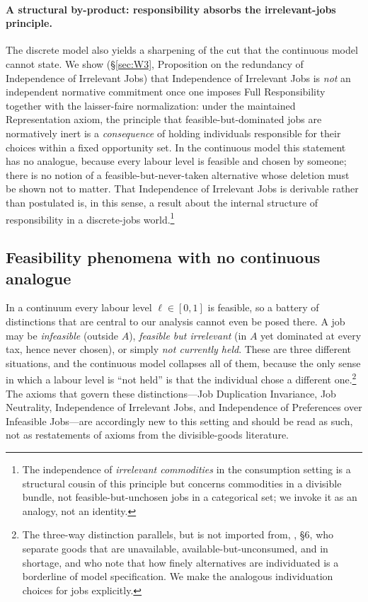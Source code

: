 \paragraph{A structural by-product: responsibility absorbs the
irrelevant-jobs principle.}
The discrete model also yields a sharpening of the cut that the continuous
model cannot state. We show (\S\ref{sec:W3}, Proposition on the redundancy of
Independence of Irrelevant Jobs) that Independence of Irrelevant Jobs is
\emph{not} an independent normative commitment once one imposes Full
Responsibility together with the laisser-faire normalization: under the
maintained Representation axiom, the principle that feasible-but-dominated
jobs are normatively inert is a \emph{consequence} of holding individuals
responsible for their choices within a fixed opportunity set. In the
continuous model this statement has no analogue, because every labour level is
feasible and chosen by someone; there is no notion of a feasible-but-never-taken
alternative whose deletion must be shown not to matter. That Independence of
Irrelevant Jobs is derivable rather than postulated is, in this sense, a
result about the internal structure of responsibility in a discrete-jobs
world.\footnote{%
The independence of \emph{irrelevant commodities} in the consumption setting
\textcite{FleurbaeyTadenuma2007} is a structural cousin of this principle but
concerns commodities in a divisible bundle, not feasible-but-unchosen jobs in
a categorical set; we invoke it as an analogy, not an identity.}

\subsection{Feasibility phenomena with no continuous analogue}
\label{sub:feasibility}

In a continuum every labour level $\ell\in[0,1]$ is feasible, so a battery of
distinctions that are central to our analysis cannot even be posed there. A
job may be \emph{infeasible} (outside $A$), \emph{feasible but irrelevant}
(in $A$ yet dominated at every tax, hence never chosen), or simply
\emph{not currently held}. These are three different situations, and the
continuous model collapses all of them, because the only sense in which a
labour level is ``not held'' is that the individual chose a different
one.\footnote{%
The three-way distinction parallels, but is not imported from,
\citet{FleurbaeyTadenuma2007}, \S6, who separate goods that are unavailable,
available-but-unconsumed, and in shortage, and who note that how finely
alternatives are individuated is a borderline of model specification. We make
the analogous individuation choices for jobs explicitly.}
The axioms that govern these distinctions---Job Duplication Invariance, Job
Neutrality, Independence of Irrelevant Jobs, and Independence of Preferences
over Infeasible Jobs---are accordingly new to this setting and should be read
as such, not as restatements of axioms from the divisible-goods literature.

